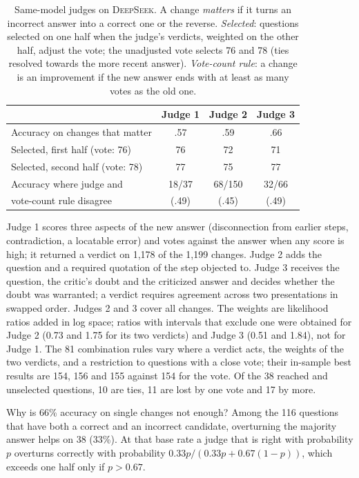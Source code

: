 \documentclass[11pt]{article}
\newcommand{\ds}{\textsc{DeepSeek}}
\begin{document}
\begin{table}[h]
\centering
\small
\setlength{\tabcolsep}{3.5pt}
\begin{tabular}{@{}l ccc@{}}
\toprule
 & Judge 1 & Judge 2 & Judge 3 \\
\midrule
Accuracy on changes that matter & .57 & .59 & .66 \\
Selected, first half (vote: 76) & 76 & 72 & 71 \\
Selected, second half (vote: 78) & 77 & 75 & 77 \\
Accuracy where judge and & 18/37 & 68/150 & 32/66 \\
\quad vote-count rule disagree & (.49) & (.45) & (.49) \\
\bottomrule
\end{tabular}
\caption{Same-model judges on \ds. A change \emph{matters} if it turns an incorrect answer into a correct one or the reverse. \emph{Selected}: questions selected on one half when the judge's verdicts, weighted on the other half, adjust the vote; the unadjusted vote selects 76 and 78 (ties resolved towards the more recent answer). \emph{Vote-count rule}: a change is an improvement if the new answer ends with at least as many votes as the old one.}
\label{tab:judges}
\end{table}


Judge 1 scores three aspects of the new answer (disconnection from earlier steps, contradiction, a locatable error) and votes against the answer when any score is high; it returned a verdict on 1{,}178 of the 1{,}199 changes.
Judge 2 adds the question and a required quotation of the step objected to.
Judge 3 receives the question, the critic's doubt and the criticized answer and decides whether the doubt was warranted; a verdict requires agreement across two presentations in swapped order.
Judges 2 and 3 cover all changes.
The weights are likelihood ratios added in log space; ratios with intervals that exclude one were obtained for Judge 2 (0.73 and 1.75 for its two verdicts) and Judge 3 (0.51 and 1.84), not for Judge 1.
The 81 combination rules vary where a verdict acts, the weights of the two verdicts, and a restriction to questions with a close vote; their in-sample best results are 154, 156 and 155 against 154 for the vote.
Of the 38 reached and unselected questions, 10 are ties, 11 are lost by one vote and 17 by more.

Why is 66\% accuracy on single changes not enough?
Among the 116 questions that have both a correct and an incorrect candidate, overturning the majority answer helps on 38 (33\%).
At that base rate a judge that is right with probability $p$ overturns correctly with probability $0.33p/(0.33p+0.67(1-p))$, which exceeds one half only if $p>0.67$.
\end{document}
